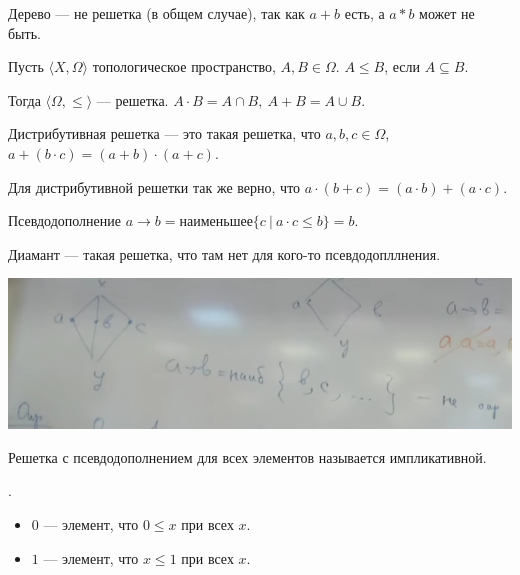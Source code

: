 \begin{example}
    Дерево --- не решетка (в общем случае), так как $a + b$ есть, а $a*b$ может не быть.
\end{example}

\begin{theorem}
    Пусть $\langle X, \Omega \rangle$ топологическое пространство, $A, B \in \Omega$. $A \leqslant B$, если $A \subseteq B$.

    Тогда $\langle \Omega, \leqslant\rangle$ --- решетка. $A \cdot B = A \cap B, ~ A + B = A \cup B$.
\end{theorem}

\begin{definition}
    Дистрибутивная решетка --- это такая решетка, что $a,b,c \in \Omega$, ~$a + (b \cdot c) = (a + b) \cdot (a + c)$.
\end{definition}

\begin{lemma}
    Для дистрибутивной решетки так же верно, что $a \cdot (b + c) = (a \cdot b) + (a \cdot c)$.
\end{lemma}

\begin{definition}
    Псевдодополнение $a \to b = \text{наименьшее} \{ c ~|~ a \cdot c \leqslant b\} = b$.
\end{definition}

\begin{definition}
    Диамант --- такая решетка, что там нет для кого-то псевдодопллнения.

    \begin{center}
        \includegraphics[scale=0.8]{img/topology_diomant}
    \end{center}
\end{definition}

\begin{definition}
    Решетка с псевдодополнением для всех элементов называется импликативной.
\end{definition}

\begin{definition}[0 и 1] .
    \begin{itemize}
        \item $0$ --- элемент, что $0 \leqslant x $ при всех $x$.
        \item $1$ --- элемент, что $x \leqslant 1 $ при всех $x$.
    \end{itemize}
\end{definition}

